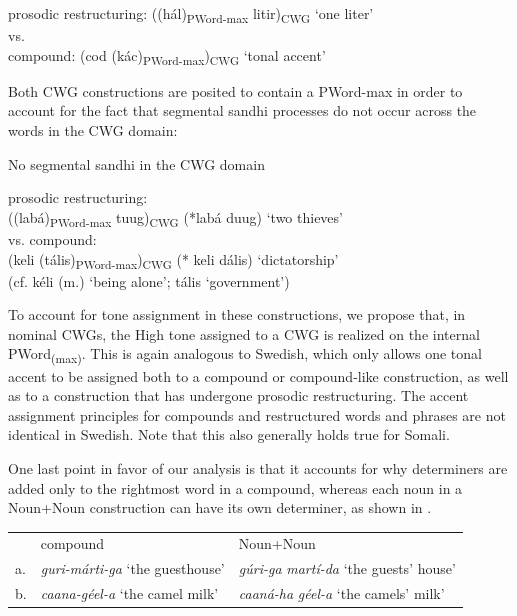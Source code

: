 \documentclass[output=paper]{langscibook}
\begin{document}
\ea \label{ex:downing:22}
 prosodic restructuring: ((hál)\textsubscript{PWord-max} litir)\textsubscript{CWG} ‘one liter’\\

{vs.}\\

{compound:   (cod (kác)\textsubscript{PWord-max})\textsubscript{CWG} ‘tonal accent’}\\
\z

Both CWG constructions are posited to contain a PWord-max in order to account for the fact that segmental sandhi processes do not occur across the words in the CWG domain:


\ea  No segmental sandhi in the CWG domain \label{ex:downing:23}

prosodic restructuring:\\((labá)\textsubscript{PWord-max} tuug)\textsubscript{CWG}  (*labá duug) \textup{‘two thieves’}\\

vs. compound:\\   (keli (tális)\textsubscript{PWord-max})\textsubscript{CWG}  (* keli dális)  ‘dictatorship’\\
\textup{(cf.} \textup{kéli} (m.) ‘being alone’; \textup{tális} ‘government’)
\z

To account for tone assignment in these constructions, we propose that, in nominal CWGs, the High tone assigned to a CWG is realized on the internal PWord\textsubscript{(max)}. This is again analogous to Swedish, which only allows one tonal accent to be assigned both to a compound or compound-like construction, as well as to a construction that has undergone prosodic restructuring. The accent assignment principles for compounds and restructured words and phrases are not identical in Swedish. Note that this also generally holds true for Somali.

One last point in favor of our analysis is that it accounts for why determiners are added only to the rightmost word in a compound, whereas each noun in a Noun+Noun construction can have its own determiner, as shown in .


\ea \label{ex:downing:24}
    \begin{tabular}[t]{@{}lll@{}}
    & compound       &   Noun+Noun\\
a. & \textit{guri-márti-ga} ‘the guesthouse’ &  \textit{gúri-ga} \textit{martí-da} ‘the guests’ house’\\
b. & \textit{caana-géel-a} ‘the camel milk’  & \textit{caaná-ha} \textit{géel-a} ‘the camels’ milk’\\
\end{tabular}
\z
\end{document}
